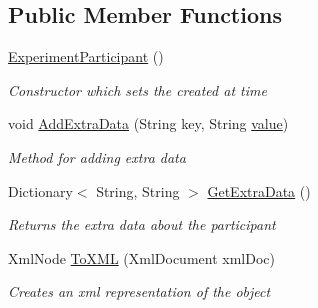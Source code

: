 \subsection*{Public Member Functions}
\begin{DoxyCompactItemize}
\item 
\hyperlink{class_web_analyzer_1_1_models_1_1_base_1_1_experiment_participant_a632bcef21dbfec67a257b0eabeed20af}{Experiment\+Participant} ()
\begin{DoxyCompactList}\small\item\em Constructor which sets the created at time \end{DoxyCompactList}\item 
void \hyperlink{class_web_analyzer_1_1_models_1_1_base_1_1_experiment_participant_a6592d4e6f7130c1c9ddd4e5c4ef81492}{Add\+Extra\+Data} (String key, String \hyperlink{_u_i_2_h_t_m_l_resources_2js_2lib_2underscore_8min_8js_af7e1471ab89699458c4df8bb657298f6}{value})
\begin{DoxyCompactList}\small\item\em Method for adding extra data \end{DoxyCompactList}\item 
Dictionary$<$ String, String $>$ \hyperlink{class_web_analyzer_1_1_models_1_1_base_1_1_experiment_participant_a2dfb5382114513277243f8833f77b6a7}{Get\+Extra\+Data} ()
\begin{DoxyCompactList}\small\item\em Returns the extra data about the participant \end{DoxyCompactList}\item 
Xml\+Node \hyperlink{class_web_analyzer_1_1_models_1_1_base_1_1_experiment_participant_a6463c49ad51859c56a396bab4137a012}{To\+X\+M\+L} (Xml\+Document xml\+Doc)
\begin{DoxyCompactList}\small\item\em Creates an xml representation of the object \end{DoxyCompactList}\end{DoxyCompactItemize}
